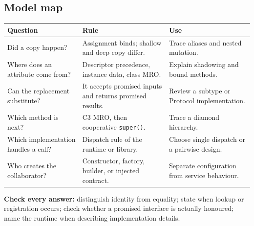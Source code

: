 \documentclass[11pt]{article}
\begin{document}
\begin{keepsection}
\section{Model map}

\begin{center}\small\begin{tabularx}{\linewidth}{>{\raggedright\arraybackslash}X>{\raggedright\arraybackslash}X>{\raggedright\arraybackslash}X}\toprule
\textbf{Question} & \textbf{Rule} & \textbf{Use} \\ \midrule
Did a copy happen? & Assignment binds; shallow and deep copy differ. & Trace aliases and nested mutation. \\
Where does an attribute come from? & Descriptor precedence, instance data, class MRO. & Explain shadowing and bound methods. \\
Can the replacement substitute? & It accepts promised inputs and returns promised results. & Review a subtype or Protocol implementation. \\
Which method is next? & C3 MRO, then cooperative \texttt{super()}. & Trace a diamond hierarchy. \\
Which implementation handles a call? & Dispatch rule of the runtime or library. & Choose single dispatch or a pairwise design. \\
Who creates the collaborator? & Constructor, factory, builder, or injected contract. & Separate configuration from service behaviour. \\
\bottomrule\end{tabularx}\end{center}

\begin{notebox}\textbf{Check every answer:} distinguish identity from equality; state when lookup or registration occurs; check whether a promised interface is actually honoured; name the runtime when describing implementation details.\end{notebox}
\end{keepsection}
\end{document}

